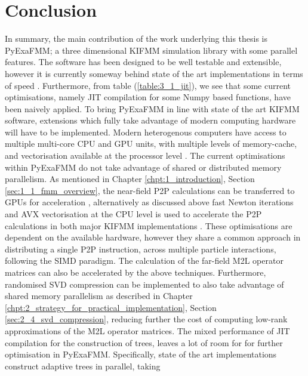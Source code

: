\chapter{Conclusion}\label{chpt:conclusion}

In summary, the main contribution of the work underlying this thesis is
\gls{PyExaFMM}; a three dimensional \gls{KIFMM} simulation library
with some parallel features. The software has been designed to be well
testable and extensible, however it is currently someway behind state of the art
implementations in terms of speed \cite{Malhotra:2015:CCP, exafmm}.
Furthermore, from table (\ref{table:3_1_jit}),
we see that some current optimisations, namely \gls{JIT} compilation for some
Numpy based functions, have been naively applied. To bring
 \gls{PyExaFMM} in line with state of the art \gls{KIFMM} software,
extensions which fully take advantage of modern computing hardware will
have to be implemented. Modern heterogenous computers have access to
multiple multi-core \gls{CPU} and \gls{GPU} units, with multiple levels of
memory-cache, and vectorisation available at the processor level
\cite{Malhotra:2015:CCP}. The current optimisations within \gls{PyExaFMM} do not
take advantage of shared or distributed memory parallelism. As mentioned in
Chapter \ref{chpt:1_introduction}, Section \ref{sec:1_1_fmm_overview}, the near-field
\gls{P2P} calculations can be transferred to \gls{GPU}s for acceleration
\cite{Hwu:2011:MKP}, alternatively as discussed above fast Newton iterations and
\gls{AVX} vectorisation at the \gls{CPU} level
is used to accelerate the \gls{P2P} calculations in both major \gls{KIFMM}
implementations \cite{Malhotra:2015:CCP, exafmm}. These optimisations are
dependent on the available hardware, however they share a common approach in distributing
a single \gls{P2P} instruction, across multiple particle interactions, following
the \gls{SIMD} paradigm. The calculation of the far-field \gls{M2L} operator
matrices can also be accelerated by the above techniques. Furthermore, randomised
\gls{SVD} compression \cite{Erichson:2019:JOSS, Halko:2011:SIAM} can be implemented
to also take advantage of shared memory parallelism as described in Chapter
\ref{chpt:2_strategy_for_practical_implementation}, Section \ref{sec:2_4_svd_compression},
reducing further the cost of computing low-rank approximations of the \gls{M2L} operator matrices.
The mixed performance of \gls{JIT} compilation for the construction of trees,
leaves a lot of room for for further optimisation in \gls{PyExaFMM}. Specifically,
state of the art implementations construct adaptive trees in parallel, taking
